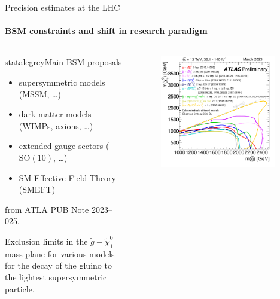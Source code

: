
\begin{frame}{Precision estimates at the LHC}
  \framesubtitle{BSM constraints and shift in research paradigm}

  \begin{columns}

    \begin{column}{0.5 \textwidth}

      \begin{colorblock}[black]{statalegrey}{Main BSM proposals}
        \begin{itemize}
          \item supersymmetric models (MSSM, \dots)
          \item dark matter models (WIMPs, axions, \dots)
          \item extended gauge sectors ($ \mathrm{SO}(10) $, \dots)
          \item SM Effective Field Theory (SMEFT)
        \end{itemize}
      \end{colorblock}

      \vspace{0.5em}

       from ATLA PUB Note 2023--025.

      \justifying
      Exclusion limits in the $ \tilde{g} - \tilde{\chi}^0_1 $ mass plane for various models for the decay of the gluino to the lightest supersymmetric particle.

    \end{column}

    \begin{column}{0.5\textwidth}

      \begin{figure}
        \centering
        \includegraphics[width = 0.94\textwidth]{imgs/susy.png}
      \end{figure}


\end{column}
\end{columns}
\end{frame}
